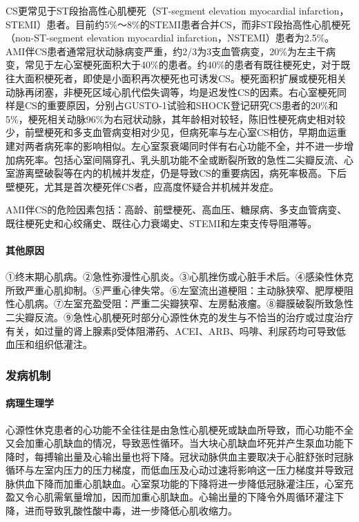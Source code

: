CS更常见于ST段抬高性心肌梗死（ST-segment elevation myocardial
infarction，STEMI）患者。目前约5\%～8\%的STEMI患者合并CS，而非ST段抬高性心肌梗死（non-ST-segment
elevation myocardial
infarction，NSTEMI）患者为2.5\%。AMI伴CS患者通常冠状动脉病变严重，约2/3为3支血管病变，20\%为左主干病变，常见于左心室梗死面积大于40\%的患者。约40\%的患者有既往梗死史，对于既往大面积梗死者，即使是小面积再次梗死也可诱发CS。梗死面积扩展或梗死相关动脉再闭塞，非梗死区域心肌代偿失调等，均是迟发性CS的因素。右心室梗死同样是CS的重要原因，分别占GUSTO-1试验和SHOCK登记研究CS患者的20\%和5\%，梗死相关动脉96\%为右冠状动脉，其年龄相对较轻，陈旧性梗死病史相对较少，前壁梗死和多支血管病变相对少见，但病死率与左心室CS相仿，早期血运重建对两者病死率的影响相似。左心室泵衰竭同时伴有右心功能不全，并不进一步增加病死率。包括心室间隔穿孔、乳头肌功能不全或断裂所致的急性二尖瓣反流、心室游离壁破裂等在内的机械并发症，仍是导致CS的重要病因，病死率极高。下后壁梗死，尤其是首次梗死伴CS者，应高度怀疑合并机械并发症。

AMI伴CS的危险因素包括：高龄、前壁梗死、高血压、糖尿病、多支血管病变、既往梗死史和心绞痛史、既往心力衰竭史、STEMI和左束支传导阻滞等。

\paragraph{其他原因}

①终末期心肌病。②急性弥漫性心肌炎。③心肌挫伤或心脏手术后。④感染性休克所致严重心肌抑制。⑤严重心律失常。⑥左室流出道梗阻：主动脉狭窄、肥厚梗阻性心肌病。⑦左室充盈受阻：严重二尖瓣狭窄、左房黏液瘤。⑧瓣膜破裂所致急性二尖瓣反流。⑨急性心肌梗死时部分心源性休克的发生与不恰当的治疗或过度治疗有关，如过量的肾上腺素β受体阻滞药、ACEI、ARB、吗啡、利尿药均可导致低血压和组织低灌注。

\subsubsection{发病机制}

\paragraph{病理生理学}

心源性休克患者的心功能不全往往是由急性心肌梗死或缺血所导致，而心功能不全又会加重心肌缺血的情况，导致恶性循环。当大块心肌缺血坏死并产生泵血功能下降时，每搏输出量及心输出量也将下降。冠状动脉供血主要取决于心脏舒张时冠脉循环与左室内压力的压力梯度，而低血压及心动过速将影响这一压力梯度并导致冠脉供血下降而加重心肌缺血。心室泵功能的下降将进一步降低冠脉灌注压，心室充盈又令心肌需氧量增加，因而加重心肌缺血。心输出量的下降令外周循环灌注下降，进而导致乳酸性酸中毒，进一步降低心肌收缩力。

